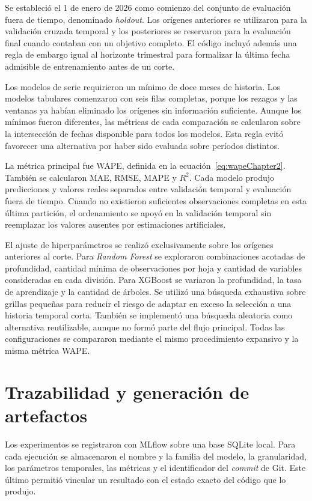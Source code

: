 Se estableció el 1 de enero de 2026 como comienzo del conjunto de evaluación fuera de tiempo, denominado \textit{holdout}. Los orígenes anteriores se utilizaron para la validación cruzada temporal y los posteriores se reservaron para la evaluación final cuando contaban con un objetivo completo. El código incluyó además una regla de embargo igual al horizonte trimestral para formalizar la última fecha admisible de entrenamiento antes de un corte.

Los modelos de serie requirieron un mínimo de doce meses de historia. Los modelos tabulares comenzaron con seis filas completas, porque los rezagos y las ventanas ya habían eliminado los orígenes sin información suficiente. Aunque los mínimos fueron diferentes, las métricas de cada comparación se calcularon sobre la intersección de fechas disponible para todos los modelos. Esta regla evitó favorecer una alternativa por haber sido evaluada sobre períodos distintos.

La métrica principal fue WAPE, definida en la ecuación~\ref{eq:wapeChapter2}. También se calcularon MAE, RMSE, MAPE y $R^2$. Cada modelo produjo predicciones y valores reales separados entre validación temporal y evaluación fuera de tiempo. Cuando no existieron suficientes observaciones completas en esta última partición, el ordenamiento se apoyó en la validación temporal sin reemplazar los valores ausentes por estimaciones artificiales.

El ajuste de hiperparámetros se realizó exclusivamente sobre los orígenes anteriores al corte. Para \textit{Random Forest} se exploraron combinaciones acotadas de profundidad, cantidad mínima de observaciones por hoja y cantidad de variables consideradas en cada división. Para XGBoost se variaron la profundidad, la tasa de aprendizaje y la cantidad de árboles. Se utilizó una búsqueda exhaustiva sobre grillas pequeñas para reducir el riesgo de adaptar en exceso la selección a una historia temporal corta. También se implementó una búsqueda aleatoria como alternativa reutilizable, aunque no formó parte del flujo principal. Todas las configuraciones se compararon mediante el mismo procedimiento expansivo y la misma métrica WAPE.

\section{Trazabilidad y generación de artefactos}
\label{sec:trazabilidadArtefactos}

Los experimentos se registraron con MLflow sobre una base SQLite local. Para cada ejecución se almacenaron el nombre y la familia del modelo, la granularidad, los parámetros temporales, las métricas y el identificador del \textit{commit} de Git. Este último permitió vincular un resultado con el estado exacto del código que lo produjo.

